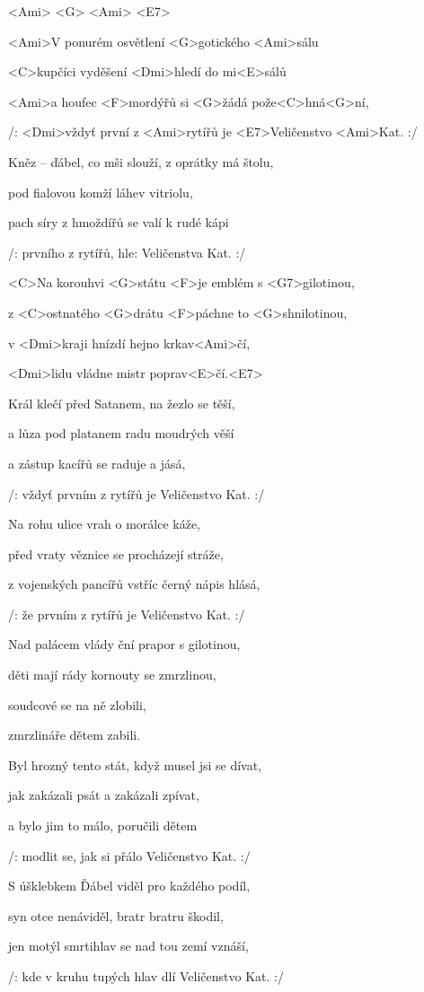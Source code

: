 

<Ami>	<G>	<Ami>	<E7>

\zs
<Ami>V ponurém osvětlení <G>gotického <Ami>sálu

<C>kupčíci vyděšení <Dmi>hledí do mi<E>sálů

<Ami>a houfec <F>mordýřů si <G>žádá pože<C>hná<G>ní,

/: <Dmi>vždyť první z <Ami>rytířů je <E7>Veličenstvo <Ami>Kat. :/
\ks

\zs
Kněz -- ďábel, co mši slouží, z oprátky má štolu,

pod fialovou komží láhev vitriolu,

pach síry z hmoždířů se valí k rudé kápi

/: prvního z rytířů, hle: Veličenstva Kat. :/
\ks

\zr
<C>Na korouhvi <G>státu <F>je emblém s <G7>gilotinou,

z <C>ostnatého <G>drátu <F>páchne to <G>shnilotinou,

v <Dmi>kraji hnízdí hejno krkav<Ami>čí,

<Dmi>lidu vládne mistr poprav<E>čí.<E7>
\kr

\zs
Král klečí před Satanem, na žezlo se těší,

a lůza pod platanem radu moudrých věší

a zástup kacířů se raduje a jásá,

/: vždyť prvním z rytířů je Veličenstvo Kat. :/
\ks

\zs
Na rohu ulice vrah o morálce káže,

před vraty věznice se procházejí stráže,

z vojenských pancířů vstříc černý nápis hlásá,

/: že prvním z rytířů je Veličenstvo Kat. :/
\ks

\zr
Nad palácem vlády ční prapor s gilotinou,

děti mají rády kornouty se zmrzlinou,

soudcové se na ně zlobili,

zmrzlináře dětem zabili.
\kr

\zs
Byl hrozný tento stát, když musel jsi se dívat,

jak zakázali psát a zakázali zpívat,

a bylo jim to málo, poručili dětem

/: modlit se, jak si přálo Veličenstvo Kat. :/
\ks

\zs
S úšklebkem Ďábel viděl pro každého podíl,

syn otce nenáviděl, bratr bratru škodil,

jen motýl smrtihlav se nad tou zemí vznáší,

/: kde v kruhu tupých hlav dlí Veličenstvo Kat. :/
\ks

\kp






